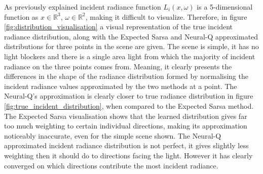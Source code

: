 \documentclass[../dissertation.tex]{subfiles}
\begin{document}
As previously explained incident radiance function $L_i(x, \omega)$ is a 5-dimensional function as $x \in \mathbb{R}^3$, $\omega \in \mathbb{R}^2$, making it difficult to visualize. Therefore, in figure \ref{fig:distribution_visualisation} a visual representation of the true incident radiance distribution, along with the Expected Sarsa and Neural-Q approximated distributions for three points in the scene are given. The scene is simple, it has no light blockers and there is a single area light from which the majority of incident radiance on the three points comes from. Meaning, it clearly presents the differences in the shape of the radiance distribution formed by normalising the incident radiance values approximated by the two methods at a point. The Neural-Q's approximation is clearly closer to true radiance distribution in figure \ref{fig:true_incident_distribution}, when compared to the Expected Sarsa method. The Expected Sarsa visualisation shows that the learned distribution gives far too much weighting to certain individual directions, making its approximation noticeably inaccurate, even for the simple scene shown. The Neural-Q approximated incident radiance distribution is not perfect, it gives slightly less weighting then it should do to directions facing the light. However it has clearly converged on which directions contribute the most incident radiance.
\end{document}

